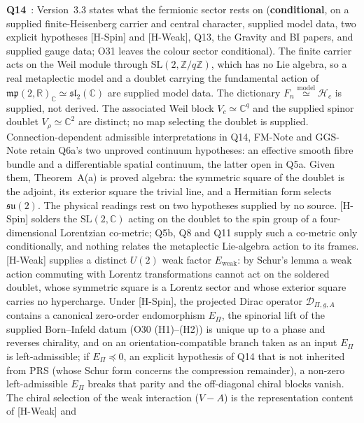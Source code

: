 \documentclass[11pt,a4paper]{article}
\providecommand{\SL}{\mathrm{SL}}
\newcommand{\scond}{\textcolor{ccond}{\textbf{conditional}}}
\begin{document}
    \textbf{Q14}~\cite{Beau2026q14}: Version~3.3 states what the fermionic sector rests on
    (\scond, on a supplied finite-Heisenberg carrier and central character, supplied model data, two
    explicit hypotheses [H-Spin] and [H-Weak], Q13, the Gravity and BI papers, and supplied gauge data;
    O31 leaves the colour sector conditional).
    The finite carrier acts on the Weil module through $\SL(2,\mathbb{Z}/q\mathbb{Z})$, which has no Lie
    algebra, so a real metaplectic model and a doublet carrying the fundamental action of
    $\mathfrak{mp}(2,\mathbb{R})_{\mathbb{C}} \simeq \mathfrak{sl}_2(\mathbb{C})$ are supplied model data.
    The dictionary $F_n \overset{\mathrm{model}}{\simeq} \mathcal{H}_c$ is supplied, not derived.
    The associated Weil block $V_c \simeq \mathbb{C}^q$ and the supplied spinor doublet
    $V_\rho \simeq \mathbb{C}^2$ are distinct; no map selecting the doublet is supplied.
    Connection-dependent admissible interpretations in Q14, FM-Note and GGS-Note retain Q6a's two
    unproved continuum hypotheses: an effective smooth fibre bundle and a differentiable spatial continuum,
    the latter open in Q5a.
    Given them, Theorem~A(a) is proved algebra: the symmetric square of the doublet is the adjoint, its
    exterior square the trivial line, and a Hermitian form selects $\mathfrak{su}(2)$.
    The physical readings rest on two hypotheses supplied by no source.
    [H-Spin] solders the $\SL(2,\mathbb{C})$ acting on the doublet to the spin group of a four-dimensional
    Lorentzian co-metric; Q5b, Q8 and Q11 supply such a co-metric only conditionally, and nothing relates
    the metaplectic Lie-algebra action to its frames.
    [H-Weak] supplies a distinct $U(2)$ weak factor $E_{\mathrm{weak}}$: by Schur's lemma a weak action
    commuting with Lorentz transformations cannot act on the soldered doublet, whose symmetric square is a
    Lorentz sector and whose exterior square carries no hypercharge.
    Under [H-Spin], the projected Dirac operator $\mathcal{D}_{\Pi,g,A}$ contains a canonical zero-order
    endomorphism $E_\Pi$, the spinorial lift of the supplied Born--Infeld datum (O30 (H1)--(H2)) is unique
    up to a phase and reverses chirality, and on an orientation-compatible branch taken as an input $E_\Pi$
    is left-admissible; if $E_\Pi \preceq 0$, an explicit hypothesis of Q14 that is not inherited from PRS (whose Schur
    form concerns the compression remainder), a non-zero left-admissible $E_\Pi$ breaks that parity and the
    off-diagonal chiral blocks vanish.
    The chiral selection of the weak interaction ($V{-}A$) is the representation content of [H-Weak] and
\end{document}
